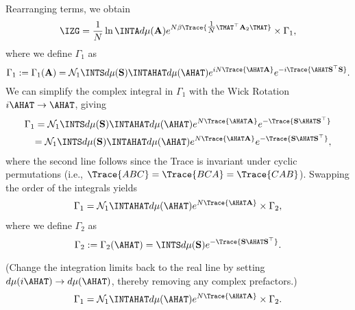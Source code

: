 Rearranging terms, we obtain 
\begin{align}
\label{eqn:IZG_Gamma1}
\IZG =  \frac{1}{N} \ln \INTA d\mu(\mathbf{A}) 
            e^{  N\beta \Trace{ \tfrac{1}{N} \TMAT^{\top}\mathbf{A}_{2}\TMAT } } \times
           \Gamma_1  ,
\end{align}
where we define $\Gamma_1$ as 
\begin{equation*}
\Gamma_1 := \Gamma_1(\mathbf{A}) 
         = \mathcal{N}_1 \INTS d\mu(\mathbf{S}) 
                           \INTAHAT d\mu(\AHAT) e^{ iN \Trace{ \AHAT\mathbf{A} } }
                                                           e^{ -i \Trace{ \AHAT\mathbf{S}^{\top} \mathbf{S} } } .
\end{equation*}
We can simplify the complex integral in $\Gamma_1$ with the Wick Rotation $i\AHAT\rightarrow\AHAT$, giving
\begin{eqnarray}
\label{eqn:QWick}
\Gamma_1 = \mathcal{N}_1 \INTS d\mu(\mathbf{S})\INTAHAT d\mu(\AHAT) 
           e^{ N \Trace{ \AHAT\mathbf{A} } }
           e^{ - \Trace{ \mathbf{S}\AHAT\mathbf{S}^{\top} } } \\
\label{eqn:QWick2}
         = \mathcal{N}_1 \INTS d\mu(\mathbf{S})\INTAHAT d\mu(\AHAT) 
           e^{ N \Trace{ \AHAT\mathbf{A} } }
           e^{ -\Trace{ \mathbf{S}\AHAT\mathbf{S}^{\top} } } ,
\end{eqnarray}
where the second line follows since the Trace is invariant under cyclic permutations (i.e., $\Trace{ABC}=\Trace{BCA}=\Trace{CAB}$).
Swapping the order of the integrals yields
\begin{eqnarray}
\label{eqn:QWick3}
\Gamma_1  = \mathcal{N}_1
           \INTAHAT d\mu(\AHAT) 
           e^{ N \Trace{ \AHAT\mathbf{A} } }\times
           \Gamma_2  ,
\end{eqnarray}
where we define $\Gamma_2$ as
\begin{equation*}
\Gamma_2 := \Gamma_2(\AHAT)
         = \INTS d\mu(\mathbf{S})
           e^{ -\Trace{ \mathbf{S}\AHAT\mathbf{S}^{\top} } } .
\end{equation*}

\noindent
(Change the integration limits back to the real line by setting $d\mu(i\AHAT)\rightarrow d\mu(\AHAT)$, thereby removing any complex prefactors.)
\begin{eqnarray}
\label{eqn:QWick4}
\Gamma_1  = \mathcal{N}_1
           \INTAHAT d\mu(\AHAT) 
           e^{ N \Trace{ \AHAT\mathbf{A} } }\times
           \Gamma_2  .
\end{eqnarray}

